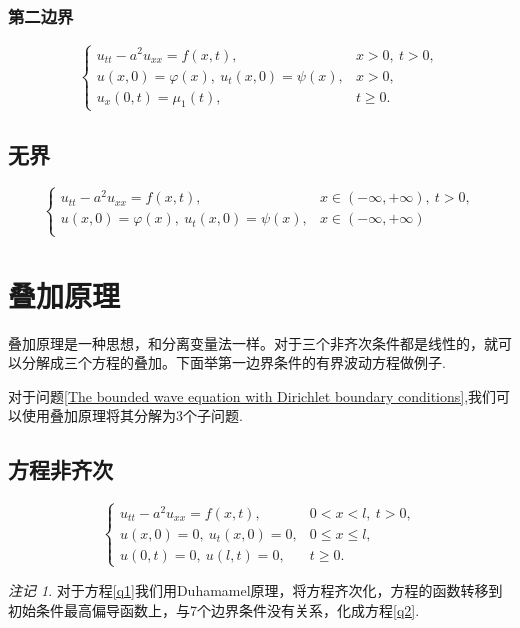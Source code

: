 \documentclass[12pt,a4paper]{article}
\numberwithin{subsection}{section}
\numberwithin{subsubsection}{subsection}
\theoremstyle{plain}
\theoremstyle{definition}
\theoremstyle{remark}
\newtheorem{remark}[theorem]{注记}
\begin{document}
\subsubsection{第二边界}
\begin{equation}\label{The wave equation on a half-line with Neumann boundary conditions}
	\begin{cases}
		u_{tt} - a^2 u_{xx} = f(x, t), &  x > 0, \ t > 0, \\
		u(x, 0) = \varphi(x), \ u_t(x, 0) = \psi(x), & x > 0, \\
		u_x(0, t) = \mu_1(t), & t \geq 0.
	\end{cases}
	\end{equation}

	\subsection{无界}
	
	\begin{equation}\label{The unbounded wave equation}
		\begin{cases}
			u_{tt} - a^2 u_{xx} = f(x, t), &  x \in (-\infty , +\infty), \ t > 0, \\
			u(x, 0) = \varphi(x), \ u_t(x, 0) = \psi(x), & x \in (-\infty , +\infty) \\
		\end{cases}
	\end{equation}
	
	
	
		\newpage
	\section{叠加原理}
	叠加原理是一种思想，和分离变量法一样。对于三个非齐次条件都是线性的，就可以分解成三个方程的叠加。下面举第一边界条件的有界波动方程做例子.
	
	对于问题\eqref{The bounded wave equation with Dirichlet boundary conditions},我们可以使用叠加原理将其分解为3个子问题.
		\subsection{方程非齐次}
				\begin{equation}\label{q1}
		\begin{cases}
			u_{tt} - a^2 u_{xx} = f(x, t), & 0 < x < l, \ t > 0, \\
			u(x, 0) = 0, \ u_t(x, 0) = 0, & 0 \leq x \leq l, \\
			u(0, t) = 0, \ u(l, t) = 0, & t \geq 0.
		\end{cases}
	\end{equation}
	\begin{remark}
	对于方程\eqref{q1}我们用Duhamamel原理，将方程齐次化，方程的函数转移到初始条件最高偏导函数上，与7个边界条件没有关系，化成方程\eqref{q2}.
	\end{remark}
		
\end{document}
